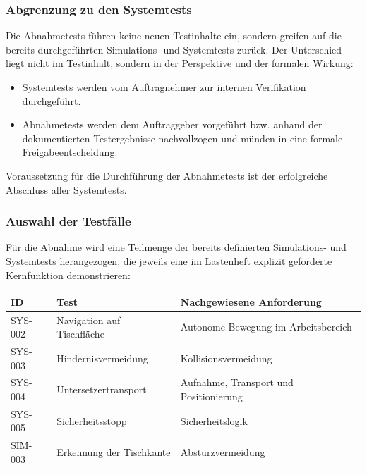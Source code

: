 \subsubsection{Abgrenzung zu den
Systemtests}\label{abgrenzung-zu-den-systemtests}

Die Abnahmetests führen keine neuen Testinhalte ein, sondern greifen auf
die bereits durchgeführten Simulations- und Systemtests zurück. Der
Unterschied liegt nicht im Testinhalt, sondern in der Perspektive und
der formalen Wirkung:

\begin{itemize}
\tightlist
\item
  Systemtests werden vom Auftragnehmer zur internen Verifikation
  durchgeführt.
\item
  Abnahmetests werden dem Auftraggeber vorgeführt bzw. anhand der
  dokumentierten Testergebnisse nachvollzogen und münden in eine formale
  Freigabeentscheidung.
\end{itemize}

Voraussetzung für die Durchführung der Abnahmetests ist der erfolgreiche
Abschluss aller Systemtests.

\subsubsection{Auswahl der Testfälle}\label{auswahl-der-testfuxe4lle}

Für die Abnahme wird eine Teilmenge der bereits definierten Simulations-
und Systemtests herangezogen, die jeweils eine im Lastenheft explizit
geforderte Kernfunktion demonstrieren:

\begin{longtable}[]{@{}
  >{\raggedright\arraybackslash}p{}
  >{\raggedright\arraybackslash}p{}
  >{\raggedright\arraybackslash}p{}@{}}
\toprule\noalign{}
\begin{minipage}[b]{\linewidth}\raggedright
ID
\end{minipage} & \begin{minipage}[b]{\linewidth}\raggedright
Test
\end{minipage} & \begin{minipage}[b]{\linewidth}\raggedright
Nachgewiesene Anforderung
\end{minipage} \\
\midrule\noalign{}
\endhead
\bottomrule\noalign{}
\endlastfoot
SYS-002 & Navigation auf Tischfläche & Autonome Bewegung im
Arbeitsbereich \\
SYS-003 & Hindernisvermeidung & Kollisionsvermeidung \\
SYS-004 & Untersetzertransport & Aufnahme, Transport und
Positionierung \\
SYS-005 & Sicherheitsstopp & Sicherheitslogik \\
SIM-003 & Erkennung der Tischkante & Absturzvermeidung \\
\end{longtable}

